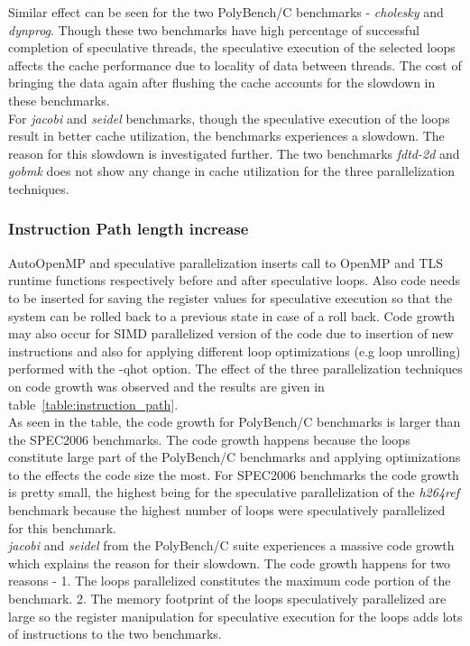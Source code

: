 \documentclass[10pt]{report}          %
\begin{document}
Similar effect can be seen for the two PolyBench/C benchmarks - \textit{cholesky} and \textit{dynprog}.  Though these two benchmarks have high percentage of successful completion of speculative threads, the speculative execution of the selected loops affects the cache performance due to locality of data between threads.  The cost of bringing the data again after flushing the cache accounts for the slowdown in these benchmarks. \\

For \textit{jacobi} and \textit{seidel} benchmarks, though the speculative execution of the loops result in better cache utilization, the benchmarks experiences a slowdown.  The reason for this slowdown is investigated further.  The two benchmarks \textit{fdtd-2d} and \textit{gobmk} does not show any change in cache utilization for the three parallelization techniques.

\subsubsection{Instruction Path length increase}

AutoOpenMP and speculative parallelization inserts call to OpenMP and TLS runtime functions respectively before and after speculative loops.  Also code needs to be inserted for saving the register values for speculative execution so that the system can be rolled back to a previous state in case of a roll back.  Code growth may also occur for SIMD parallelized version of the code due to insertion of new instructions and also for applying different loop optimizations (e.g loop unrolling) performed with the -qhot option.  The effect of the three parallelization techniques on code growth was observed and the results are given in table~\ref{table:instruction_path}. \\

As seen in the table, the code growth for PolyBench/C benchmarks is larger than the SPEC2006 benchmarks.  The code growth happens because the loops constitute large part of the PolyBench/C benchmarks and applying optimizations to the effects the code size the most.  For SPEC2006 benchmarks the code growth is pretty small, the highest being for the speculative parallelization of the \textit{h264ref} benchmark because the highest number of loops were speculatively parallelized for this benchmark. \\

\textit{jacobi} and \textit{seidel} from the PolyBench/C suite experiences a massive code growth which explains the reason for their slowdown.  The code growth happens for two reasons - 1. The loops parallelized constitutes the maximum code portion of the benchmark. 2. The memory footprint of the loops speculatively parallelized are large so the register manipulation for speculative execution for the loops adds lots of instructions to the two benchmarks.
\end{document}
